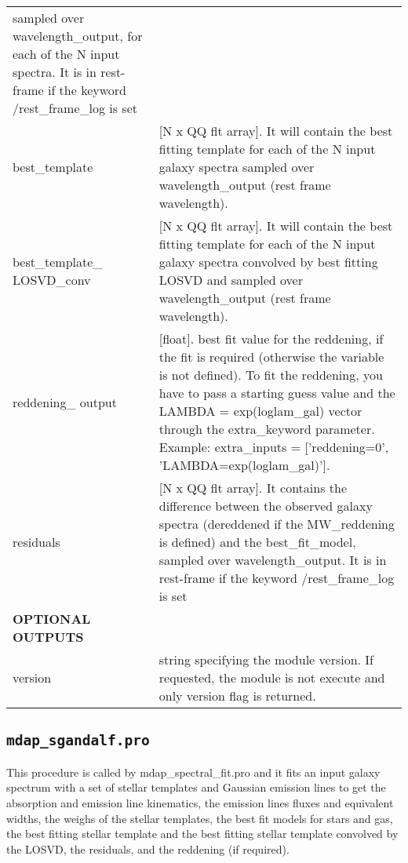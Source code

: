 \documentclass[11pt]{book}
\begin{document}
\begin{center}
\begin{longtable}{p{2.7cm}| p{11.1cm}}
                      sampled over wavelength\_output, for each of the N input spectra. It is in rest-frame if the keyword /rest\_frame\_log is set\\
%
 best\_template &[N x QQ flt array]. It will contain the best fitting template for each of the N input galaxy spectra sampled over wavelength\_output (rest frame wavelength). \\
%
 best\_template\_ LOSVD\_conv &[N x QQ flt array]. It will contain the best fitting template for each of the N input galaxy spectra convolved by best fitting 
LOSVD and sampled over wavelength\_output (rest frame wavelength).\\
%
 reddening\_ output &[float]. best fit value for the reddening, if the fit is required (otherwise the variable is not defined). To fit the reddening, you have to pass a 
                        starting guess value and the LAMBDA = exp(loglam\_gal) vector through the extra\_keyword parameter. Example: extra\_inputs = ['reddening=0', 'LAMBDA=exp(loglam\_gal)'].\\
% 
 residuals &[N x QQ flt array]. It contains the difference between the observed galaxy spectra (dereddened if the MW\_reddening is defined) and the best\_fit\_model, 
                            sampled over wavelength\_output. It is in rest-frame if the keyword /rest\_frame\_log is set\\
%
\hline
{\bf  OPTIONAL OUTPUTS} &  \\
version & string specifying the module version. If requested, the module is not execute and only version flag is returned.\\
\hline
\end{longtable}
\end{center}

\subsection{{\tt mdap\_sgandalf.pro}}
\label{dap_sec:mdap_sgandalf}

This procedure is called by mdap\_spectral\_fit.pro and it fits an
input galaxy spectrum with a set of stellar templates and Gaussian
emission lines to get the absorption and emission line kinematics, the
emission lines fluxes and equivalent widths, the weighs of the stellar
templates, the best fit models for stars and gas, the best fitting
stellar template and the best fitting stellar template convolved by
the LOSVD, the residuals, and the reddening (if required).
\end{document}
